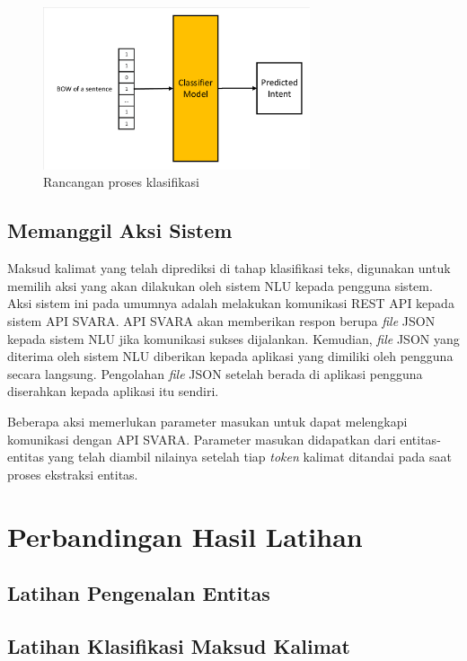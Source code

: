 \begin{figure}[H]
	\centering
	\includegraphics[width=0.7\textwidth, trim=2 2 2 2, clip]{resources/4-design_class_class.pdf}
	\caption{Rancangan proses klasifikasi}
	\label{fig:design_class_class}
\end{figure}

\subsection{Memanggil Aksi Sistem}

Maksud kalimat yang telah diprediksi di tahap klasifikasi teks, digunakan untuk memilih aksi yang akan dilakukan oleh sistem NLU kepada pengguna sistem. Aksi sistem ini pada umumnya adalah melakukan komunikasi REST API kepada sistem API SVARA. API SVARA akan memberikan respon berupa \textit{file} JSON kepada sistem NLU jika komunikasi sukses dijalankan. Kemudian, \textit{file} JSON yang diterima oleh sistem NLU diberikan kepada aplikasi yang dimiliki oleh pengguna secara langsung. Pengolahan \textit{file} JSON setelah berada di aplikasi pengguna diserahkan kepada aplikasi itu sendiri.

Beberapa aksi memerlukan parameter masukan untuk dapat melengkapi komunikasi dengan API SVARA. Parameter masukan didapatkan dari entitas-entitas yang telah diambil nilainya setelah tiap \textit{token} kalimat ditandai pada saat proses ekstraksi entitas.

\section{Perbandingan Hasil Latihan}

\subsection{Latihan Pengenalan Entitas}

\subsection{Latihan Klasifikasi Maksud Kalimat}